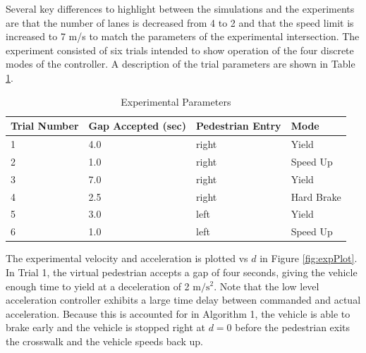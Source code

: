 \documentclass[letterpaper, 10 pt, conference]{ieeeconf}  %
\begin{document}
Several key differences to highlight between the simulations and the experiments are that the number of lanes is decreased from 4 to 2 and that the speed limit is increased to 7 m/s to match the parameters of the experimental intersection. The experiment consisted of six trials intended to show operation of the four discrete modes of the controller. A description of the trial parameters are shown in Table \ref{tb:expparams2}. 


\begin{table}[h]
\begin{center}
\caption{Experimental Parameters}\label{tb:expparams2}
\begin{tabular}{llll}
Trial Number & Gap Accepted (sec) & Pedestrian Entry & Mode\\\hline\hline
1 & 4.0 & right &  Yield\\ 
2 & 1.0 & right &  Speed Up\\ 
3 & 7.0 & right &  Yield\\ 
4 & 2.5 & right &  Hard Brake\\ 
5 & 3.0 & left  &  Yield \\ 
6 & 1.0 & left  &  Speed Up\\\hline
\end{tabular}
\end{center}
\end{table}

The experimental velocity and acceleration is plotted vs $d$ in 
Figure \ref{fig:expPlot}. In Trial 1, the virtual pedestrian accepts a gap of four seconds, giving the vehicle enough time to yield at a deceleration of 2 $\mathrm{m/s^2}$. Note that the low level acceleration controller exhibits a large time delay between commanded and actual acceleration. Because this is accounted for in Algorithm 1, the vehicle is able to brake early and the vehicle is stopped right at $d=0$ before the pedestrian exits the crosswalk and the vehicle speeds back up.  
\end{document}
